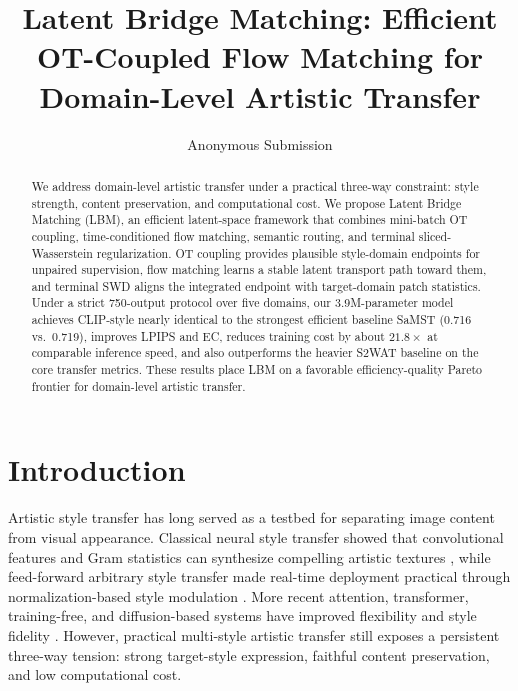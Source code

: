 ﻿\documentclass[letterpaper]{article}
\title{Latent Bridge Matching: Efficient OT-Coupled Flow Matching for Domain-Level Artistic Transfer}
\author{Anonymous Submission}
\begin{document}
\maketitle

\begin{abstract}
We address domain-level artistic transfer under a practical three-way constraint: style strength, content preservation, and computational cost. We propose Latent Bridge Matching (LBM), an efficient latent-space framework that combines mini-batch OT coupling, time-conditioned flow matching, semantic routing, and terminal sliced-Wasserstein regularization. OT coupling provides plausible style-domain endpoints for unpaired supervision, flow matching learns a stable latent transport path toward them, and terminal SWD aligns the integrated endpoint with target-domain patch statistics. Under a strict 750-output protocol over five domains, our 3.9M-parameter model achieves CLIP-style nearly identical to the strongest efficient baseline SaMST (0.716 vs.\ 0.719), improves LPIPS and EC, reduces training cost by about $21.8\times$ at comparable inference speed, and also outperforms the heavier S2WAT baseline on the core transfer metrics. These results place LBM on a favorable efficiency-quality Pareto frontier for domain-level artistic transfer.
\end{abstract}

\section{Introduction}
Artistic style transfer has long served as a testbed for separating image content from visual appearance. Classical neural style transfer showed that convolutional features and Gram statistics can synthesize compelling artistic textures \cite{gatys2016image}, while feed-forward arbitrary style transfer made real-time deployment practical through normalization-based style modulation \cite{huang2017adain}. More recent attention, transformer, training-free, and diffusion-based systems have improved flexibility and style fidelity \cite{park2019sanet,deng2022stytr2,hong2023aespa,huang2024aesfa,gim2024cast,chung2024styleid}. However, practical multi-style artistic transfer still exposes a persistent three-way tension: strong target-style expression, faithful content preservation, and low computational cost.
\end{document}
